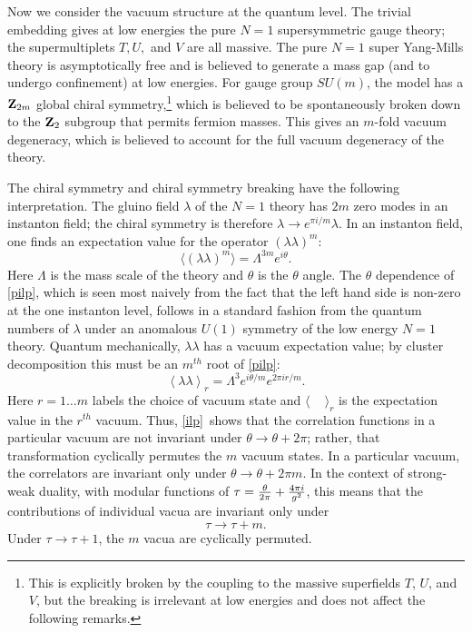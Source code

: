 \documentclass[12pt]{article}
\numberwithin{equation}{section}
\begin{document}
\bigskip
{}

Now we consider the vacuum structure at the quantum level.
The trivial embedding gives at low energies the pure $N=1$ supersymmetric
gauge theory; the supermultiplets $T,U,$ and $V$ are all massive.
The pure $N=1$ super Yang-Mills theory is asymptotically free and is
believed to generate a mass gap (and to undergo confinement) at low
energies.  For gauge group $SU(m)$, the model
has a ${\bf Z}_{2m}$ global chiral
symmetry,\footnote{This is explicitly broken by the coupling to the
  massive superfields $T$, $U$, and $V$, but the breaking is irrelevant
at low energies and does not affect the following remarks.}  which is
believed to be spontaneously
broken down to the ${\bf Z}_2$ subgroup that permits fermion masses.
This gives an $m$-fold vacuum degeneracy, which is believed to account
for the full vacuum degeneracy of the theory.

The chiral symmetry and chiral symmetry breaking have
the following interpretation.
The gluino field $\lambda$ of the $N=1$
theory has $2m$ zero modes in an instanton field; the chiral symmetry
is therefore $\lambda\to e^{\pi i/m}\lambda$.  In an instanton field,
one finds an expectation value for the operator $(\lambda\lambda)^m$:
\begin{equation}
  \label{pilp}
  \langle (\lambda\lambda)^m\rangle = \Lambda^{3m}e^{i\theta}.
\end{equation}
Here $\Lambda$ is the mass scale of the theory and $\theta$ is the
$\theta$ angle.  The $\theta$ dependence of \eqref{pilp}, which is seen
most naively from the fact that the left hand side is non-zero at
the one instanton level, follows in a standard fashion
from the quantum numbers of $\lambda$
under an anomalous $U(1)$ symmetry of the low energy $N=1$ theory.
Quantum mechanically, $\lambda\lambda$ has a vacuum expectation value;
by cluster decomposition this must be an $m^{th}$ root of \eqref{pilp}:
\begin{equation}
  \label{ilp}
  \left\langle\lambda\lambda\right
  \rangle_r=\Lambda^3e^{i\theta/m}e^{2\pi ir/m}.
\end{equation}
Here $r=1\dots m$ labels the choice of vacuum state and $\langle \,\,\,\,\,\,\,
\rangle_r$ is the expectation value in the $r^{th}$ vacuum.  Thus,
\eqref{ilp}\ shows
that the correlation functions in a particular vacuum are not invariant
under $\theta\to\theta+2\pi$; rather, that transformation cyclically permutes
the $m$ vacuum states.  In a particular vacuum, the correlators are
invariant only under $\theta\to\theta+2\pi m$.
In the context of strong-weak duality, with modular functions of
$\tau={\theta\over 2\pi}+{4\pi i\over g^2}$, this means that the contributions
of individual vacua are invariant only under
\begin{equation}
  \label{onlyunder}
  \tau \to \tau+m.
\end{equation}
Under $\tau\to\tau +1$, the $m$ vacua are  cyclically permuted.
\end{document}
